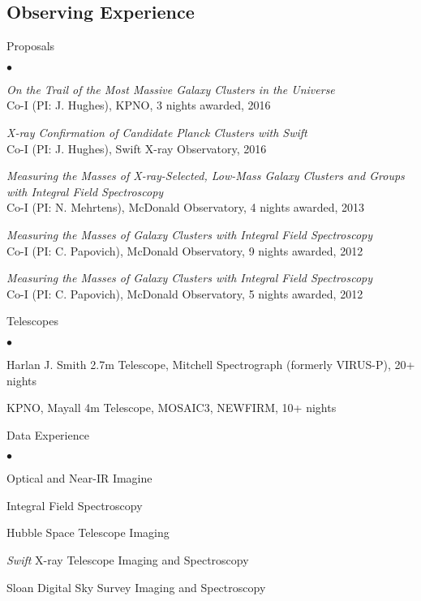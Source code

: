 \documentclass[margin,line, 11pt]{res}
\newenvironment{list2}{
  \begin{list}{$\bullet$}{%
      \setlength{\itemsep}{0in}
      \setlength{\parsep}{0in} \setlength{\parskip}{0in}
      \setlength{\topsep}{0in} \setlength{\partopsep}{0in}
      \setlength{\leftmargin}{0.2in}}}{\end{list}}
\begin{document}
\begin{resume}
\section{Observing Experience}
Proposals
    \begin{list2}
        \vspace*{.05in}
    \item \emph{On the Trail of the Most Massive Galaxy Clusters in the Universe}\\
    Co-I (PI: J. Hughes), KPNO, 3 nights awarded, 2016
    \item \emph{X-ray Confirmation of Candidate Planck Clusters with Swift}\\
    Co-I (PI: J. Hughes), Swift X-ray Observatory, 2016
    \item \emph{Measuring the Masses of X-ray-Selected, Low-Mass Galaxy Clusters and Groups with Integral Field Spectroscopy}\\
		Co-I (PI: N. Mehrtens), McDonald Observatory, 4 nights awarded, 2013
    \item \emph{Measuring the Masses of Galaxy Clusters with Integral Field Spectroscopy}\\
		Co-I (PI: C. Papovich), McDonald Observatory, 9 nights awarded, 2012
    \item \emph{Measuring the Masses of Galaxy Clusters with Integral Field Spectroscopy}\\
		Co-I (PI: C. Papovich), McDonald Observatory, 5 nights awarded, 2012
	\end{list2}
Telescopes
    \begin{list2}
        \vspace*{.05in}
    \item Harlan J. Smith 2.7m Telescope, Mitchell Spectrograph (formerly VIRUS-P), 20+ nights
    \item KPNO, Mayall 4m Telescope, MOSAIC3, NEWFIRM, 10+ nights
	\end{list2}
Data Experience
    \begin{list2}
        \vspace*{.05in}
    \item Optical and Near-IR Imagine
		\item Integral Field Spectroscopy
    \item Hubble Space Telescope Imaging
    \item \textit{Swift} X-ray Telescope Imaging and Spectroscopy
		\item Sloan Digital Sky Survey Imaging and Spectroscopy
	\end{list2}


\end{resume}
\end{document}
